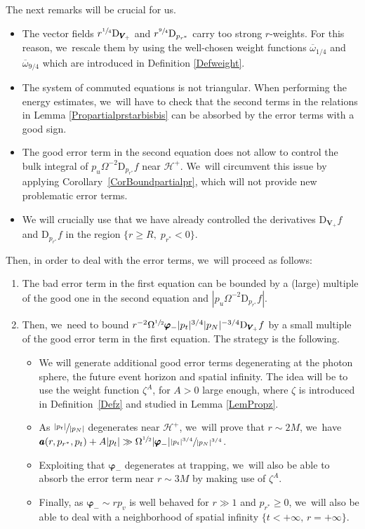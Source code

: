 \documentclass[10pt]{amsart}
\theoremstyle{plain}
\theoremstyle{definition}
\newcommand\z{{\zeta}}
\renewcommand\H{{\mathcal{H}^+}}
\begin{document}
The next remarks will be crucial for us.
\begin{itemize}
\item The vector fields $r^{\sfrac{1}{4}}\mathrm{D}_{\pmb{V}_{\!+}}$ and $r^{\sfrac{9}{4}} \mathrm{D}_{p_{r^*}}$ carry too strong $r$-weights. For this reason, we~rescale them by using the well-chosen weight functions $\overline{\omega}_{1/4}$ and $\overline{\omega}_{9/4}$ which are introduced in Definition \ref{Defweight}.
\item The system of commuted equations is not triangular. When performing the energy estimates, we~will have to check that the second terms in the relations in Lemma \ref{Propartialprstarbisbis} can be absorbed by the error terms with a good sign.
\item The good error term in the second equation does not allow to control the bulk integral of $p_u\Omega^{-2} \mathrm{D}_{p_{r^*}}f$ near $\H$. We~will circumvent this issue by applying Corollary~\ref{CorBoundpartialpr}, which will not provide new problematic error terms.
\item We will crucially use that we have already controlled the derivatives $\mathrm{D}_{\pmb{V}_{\!+}} f$ and $ \mathrm{D}_{p_{r^*}}f$ in the region $\{ r \geq R, \; p_{r^*} <0 \}$.
\end{itemize}

Then, in order to deal with the error terms, we~will proceed as follows:
\begin{enumerate}
\item The bad error term in the first equation can be bounded by a (large) multiple of the good one in the second equation and $|p_u\Omega^{-2} \mathrm{D}_{p_{r^*}}f|$.
\item Then, we~need to bound $r^{-2}\Omega^{\sfrac{1}{2}}\pmb{\varphi}_-|p_t|^{3/4}|p_N|^{-3/4} \mathrm{D}_{\pmb{V}_{\!+}} f$ by a small multiple of the good error term in the first equation. The strategy is the following.
\begin{itemize}
\item We will generate additional good error terms degenerating at the photon sphere, the future event horizon and spatial infinity. The idea will be to use the weight function $\z^A$, for $A>0$ large enough, where $\z$ is introduced in Definition~\ref{Defz} and studied in Lemma \ref{LemPropz}.
\item As $\sfrac{|p_t|}{|p_N|}$ degenerates near $\H\!$, we~will prove that $r \sim 2M$, we~have $\pmb{a}(r,p_{r^*},p_t)+A|p_t| \gg \Omega^{\sfrac{1}{2}}|\pmb{\varphi}_-|\sfrac{|p_t|^{3/4}}{|p_N|^{3/4}}$.
\item Exploiting that $\pmb{\varphi}_-$ degenerates at trapping, we~will also be able to absorb the error term near $r \sim 3M$ by making use of $\z^A$.
\item Finally, as $\pmb{\varphi}_- \sim rp_v$ is well behaved for $r \gg 1$ and $p_{r^*} \geq 0$, we~will also be able to deal with a neighborhood of spatial infinity $\{ t <+\infty, \, r=+\infty \}$.
\end{itemize}
\end{enumerate}
\end{document}
